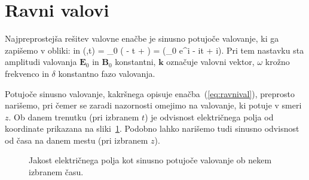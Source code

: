 \section{Ravni valovi}
Najpreprostejša rešitev valovne enačbe je sinusno potujoče valovanje, ki ga zapišemo
v obliki:
in 
\beq
{}(,t) = _0 \cos \left(\cdot {} - \omega t + \delta\right) = 
\Re\left(_0 e^{i\cdot {} - i\omega t + i\delta}\right)\!\!.
\label{eq:ravnivalB}
\eeq
Pri tem nastavku sta amplitudi valovanja $\mathbf{E}_0$ in $\mathbf{B}_0$ konstantni, 
$\mathbf{k}$ označuje valovni vektor, 
$\omega$ krožno frekvenco in $\delta$ konstantno fazo
valovanja. 

Potujoče sinusno valovanje, kakršnega opisuje enačba~(\ref{eq:ravnival}), preprosto
narišemo, pri čemer se zaradi nazornosti omejimo na valovanje, ki potuje v smeri $z$. 
Ob danem trenutku (pri izbranem $t$) je odvisnost električnega polja od
koordinate prikazana na sliki~\ref{fig:03_sinus}. Podobno lahko narišemo tudi 
sinusno odvisnost od časa na danem mestu (pri izbranem $z$). 

\begin{figure}[!h]
\centering
\def\svgwidth{90truemm} 

\caption{Jakost električnega polja kot sinusno potujoče valovanje ob nekem izbranem času.}
\label{fig:03_sinus}
\end{figure}

